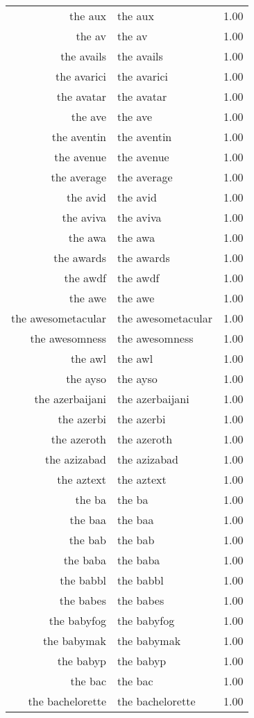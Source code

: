 \begin{table}[ht]
\begin{tabular}{rlr}
  the aux & the aux & 1.00 \\ 
  the av & the av & 1.00 \\ 
  the avails & the avails & 1.00 \\ 
  the avarici & the avarici & 1.00 \\ 
  the avatar & the avatar & 1.00 \\ 
  the ave & the ave & 1.00 \\ 
  the aventin & the aventin & 1.00 \\ 
  the avenue & the avenue & 1.00 \\ 
  the average & the average & 1.00 \\ 
  the avid & the avid & 1.00 \\ 
  the aviva & the aviva & 1.00 \\ 
  the awa & the awa & 1.00 \\ 
  the awards & the awards & 1.00 \\ 
  the awdf & the awdf & 1.00 \\ 
  the awe & the awe & 1.00 \\ 
  the awesometacular & the awesometacular & 1.00 \\ 
  the awesomness & the awesomness & 1.00 \\ 
  the awl & the awl & 1.00 \\ 
  the ayso & the ayso & 1.00 \\ 
  the azerbaijani & the azerbaijani & 1.00 \\ 
  the azerbi & the azerbi & 1.00 \\ 
  the azeroth & the azeroth & 1.00 \\ 
  the azizabad & the azizabad & 1.00 \\ 
  the aztext & the aztext & 1.00 \\ 
  the ba & the ba & 1.00 \\ 
  the baa & the baa & 1.00 \\ 
  the bab & the bab & 1.00 \\ 
  the baba & the baba & 1.00 \\ 
  the babbl & the babbl & 1.00 \\ 
  the babes & the babes & 1.00 \\ 
  the babyfog & the babyfog & 1.00 \\ 
  the babymak & the babymak & 1.00 \\ 
  the babyp & the babyp & 1.00 \\ 
  the bac & the bac & 1.00 \\ 
  the bachelorette & the bachelorette & 1.00 \\ 

\end{tabular}
\end{table}

